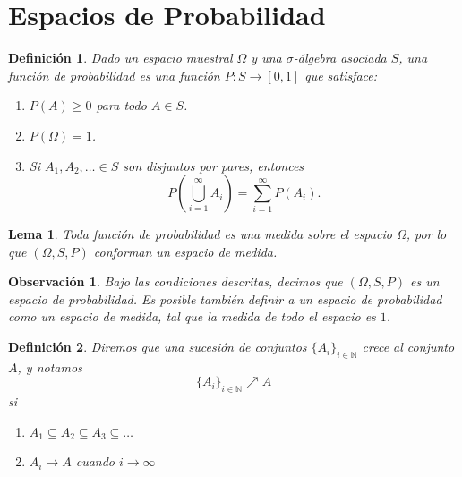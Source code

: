 \documentclass{report}
\newtheorem{lem}{Lema}[section]
\newtheorem{dfn}{Definición}[section]
\newtheorem{obs}{Observación}[section]
\begin{document}
\section{Espacios de Probabilidad}

\begin{dfn}
Dado un espacio muestral \( \Omega \) y una $\sigma$-álgebra asociada \( S \),
una \emph{función de probabilidad} es una función \( P \colon S \to [0,1] \) que satisface:

\begin{enumerate}
    \item \( P(A) \geq 0 \) para todo \( A \in S \).
    \item \( P(\Omega) = 1 \).
    \item Si \( A_1, A_2, \dots \in S \) son disjuntos por pares, entonces
    \[
        P\left( \bigcup_{i=1}^{\infty} A_i \right) = \sum_{i=1}^{\infty} P(A_i).
    \]
\end{enumerate}
\end{dfn}

\begin{lem}
    Toda función de probabilidad es una medida sobre el espacio $\Omega$, por lo que $(\Omega, S, P)$ conforman un espacio de medida.
\end{lem}

\begin{obs}
    Bajo las condiciones descritas, decimos que $(\Omega, S, P)$ es un \emph{espacio de probabilidad}. Es posible también definir
    a un espacio de probabilidad como un espacio de medida, tal que la medida de todo el espacio es $1$.
\end{obs}

\begin{dfn}
Diremos que una sucesión de conjuntos $\{A_i\}_{i\in\mathbb{N}}$ \emph{crece} al conjunto $A$, y notamos
$$
\{A_i\}_{i\in\mathbb{N}}\nearrow A
$$
si
\begin{enumerate}
    \item $A_1 \subseteq A_2 \subseteq A_3 \subseteq \dots$
    \item $A_i \rightarrow A$ cuando $i\rightarrow \infty$
\end{enumerate}
\end{dfn}
\end{document}
